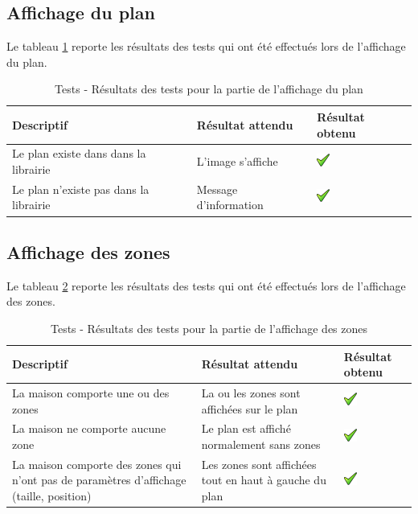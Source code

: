 \clearpage

\subsection{Affichage du plan} %
\label{sub:logout}
Le tableau \ref{tab:testAffichagePlan} reporte les résultats des tests qui ont été effectués lors de l'affichage du plan.
\begin{table}[H]
\begin{tabularx}{\textwidth}{|X|X|m{1.5cm}|}
  \hline
  \bf{Descriptif} & \bf{Résultat attendu} & \bf{Résultat obtenu} \\
  \hline
  Le plan existe dans dans la librairie & L'image s'affiche & \includegraphics[width=16px]{00_media/ok.png} \\
  \hline
  Le plan n'existe  pas dans la librairie & Message d'information & \includegraphics[width=16px]{00_media/ok.png} \\
  \hline

\end{tabularx}
\caption{Tests - Résultats des tests pour la partie de l'affichage du plan}
\label{tab:testAffichagePlan}
\end{table}

\subsection{Affichage des zones} %
\label{sub:logout}
Le tableau \ref{tab:testAffichageZones} reporte les résultats des tests qui ont été effectués lors de l'affichage des zones.
\begin{table}[H]
\begin{tabularx}{\textwidth}{|X|X|m{1.5cm}|}
  \hline
  \bf{Descriptif} & \bf{Résultat attendu} & \bf{Résultat obtenu} \\
  \hline
  La maison comporte une ou des zones & La ou les zones sont affichées sur le plan & \includegraphics[width=16px]{00_media/ok.png} \\
  \hline
  La maison ne comporte aucune zone & Le plan est affiché normalement sans zones & \includegraphics[width=16px]{00_media/ok.png} \\
  \hline
  La maison comporte des zones qui n'ont pas de paramètres d'affichage (taille, position)& Les zones sont affichées tout en haut à gauche du plan & \includegraphics[width=16px]{00_media/ok.png} \\
  \hline
\end{tabularx}
\caption{Tests - Résultats des tests pour la partie de l'affichage des zones}
\label{tab:testAffichageZones}
\end{table}

